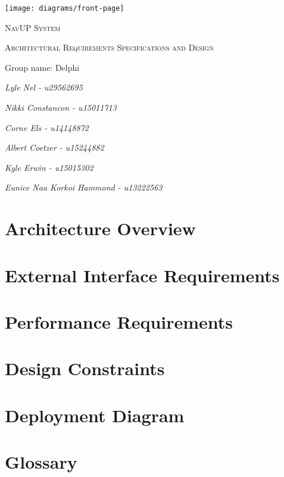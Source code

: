 \documentclass{article}
\begin{document}
\begin{titlepage}
	\centering
	\texttt{[image: diagrams/front-page]}
	\vfill
	{\scshape\LARGE NavUP System\par}
	\vfill
	{\scshape\Large Architectural Requirements Specifications and Design\par}
	\vfill
	{\Large Group name: Delphi\par}
	\bigskip 
	{\itshape\Large Lyle Nel - u29562695\par}
	{\itshape\Large Nikki Constancon - u15011713\par}
	{\itshape\Large Corne Els - u14148872\par}	
	{\itshape\Large Albert Coetzer - u15244882\par}
	{\itshape\Large Kyle Erwin - u15015302\par}
	{\itshape\Large Eunice Naa Korkoi Hammond - u13222563\par}
	\vfill
\end{titlepage}

\tableofcontents

\clearpage

\section{Architecture Overview}


\section{External Interface Requirements}


\section{Performance Requirements}


\section{Design Constraints}


\pagebreak
\section{Deployment Diagram}


\section{Glossary}

\end{document}
